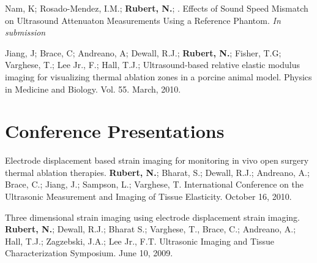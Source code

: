 \documentclass[margin,line]{res}
\begin{document}
\begin{resume}
Nam, K; Rosado-Mendez, I.M.; {\bf Rubert, N.}; .  Effects of Sound Speed Mismatch on Ultrasound Attenuaton Measurements Using a Reference Phantom.  	{\it In submission}

Jiang, J; Brace, C; Andreano, A; Dewall, R.J.; {\bf Rubert, N.}; Fisher, T.G; Varghese, T.; Lee Jr., F.; Hall, T.J.;  Ultrasound-based relative elastic modulus imaging for visualizing thermal ablation zones in a porcine animal model.  Physics in Medicine and Biology.  Vol. 55.  March, 2010.


\section{\sc Conference Presentations}

Electrode displacement based strain imaging for monitoring in vivo open surgery thermal ablation therapies.  {\bf Rubert, N.}; Bharat, S.; Dewall, R.J.; Andreano, A.; Brace, C.; Jiang, J.; Sampson, L.; Varghese, T. International Conference on the Ultrasonic Measurement and Imaging of Tissue Elasticity.  October 16, 2010.

Three dimensional strain imaging using electrode displacement strain imaging.  {\bf Rubert, N.}; Dewall, R.J.; Bharat S.; Varghese, T., Brace, C.; Andreano, A.; Hall, T.J.; Zagzebski, J.A.; Lee Jr., F.T.  Ultrasonic Imaging and Tissue Characterization Symposium.  June 10, 2009.

\end{resume}
\end{document}
